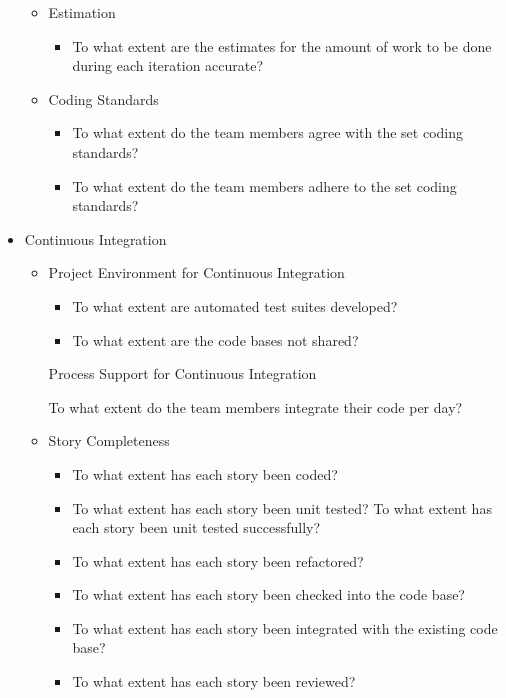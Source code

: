 \begin{appendices}
\begin{itemize}
\begin{itemize}
			\item Estimation
				\begin{itemize}
					\item To what extent are the estimates for the amount of work to be done during each iteration accurate?
				\end{itemize}
			\item Coding Standards
				\begin{itemize}
					\item To what extent do the team members agree with the set coding standards? 
					\item To what extent do the team members adhere to the set coding standards?
				\end{itemize}
		\end{itemize}
	\item Continuous Integration
		\begin{itemize}
			\item Project Environment for Continuous Integration 
				\begin{itemize}
					\item To what extent are automated test suites developed?
					\item To what extent are the code bases not shared?
				\end{itemize}
				\begin{itemize}
					\addition Process Support for Continuous Integration
						\begin{itemize}
							\addition To what extent do the team members integrate their code per day?
						\end{itemize}
				\end{itemize}
			\item Story Completeness
				\begin{itemize}
					\item To what extent has each story been coded? 
					\item To what extent has each story been unit tested? 
					\addition To what extent has each story been unit tested successfully?
					\item To what extent has each story been refactored? 
					\item To what extent has each story been checked into the code base? 
					\item To what extent has each story been integrated with the existing code base? 
					\item To what extent has each story been reviewed? 

\end{itemize}
\end{itemize}
\end{itemize}
\end{appendices}
